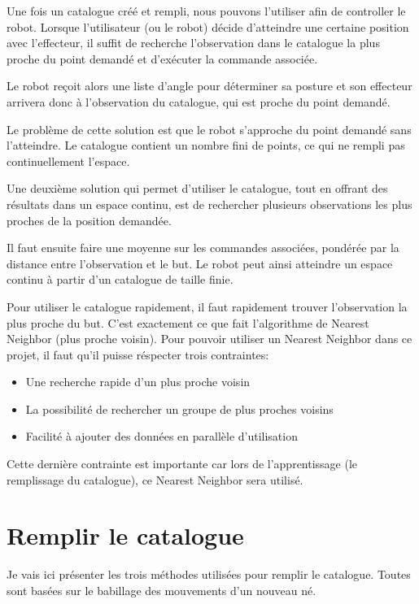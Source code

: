 \documentclass[11pt,french]{report}
\begin{document}
Une fois un catalogue créé et rempli, nous pouvons l'utiliser afin de controller le robot.
Lorsque l'utilisateur (ou le robot) décide d'atteindre une certaine position avec l'effecteur, il suffit de recherche l'observation dans le catalogue la plus proche du point demandé et d'exécuter la commande associée.

Le robot reçoit  alors une liste d'angle pour déterminer sa posture et son effecteur arrivera donc à l'observation du catalogue, qui est proche du point demandé.

\phantom{INVISIBLE LINE}

Le problème de cette solution est que le robot s'approche du point demandé sans l'atteindre.
Le catalogue contient un nombre fini de points, ce qui ne rempli pas continuellement l'espace.

Une deuxième solution qui permet d'utiliser le catalogue, tout en offrant des résultats dans un espace continu, est de rechercher plusieurs observations les plus proches de la position demandée.

Il faut ensuite faire une moyenne sur les commandes associées, pondérée par la distance entre l'observation et le but.
Le robot peut ainsi atteindre un espace continu à partir d'un catalogue de taille finie.

\phantom{INVISIBLE LINE}

Pour utiliser le catalogue rapidement, il faut rapidement trouver l'observation la plus proche du but.
C'est exactement ce que fait l'algorithme de Nearest Neighbor (plus proche voisin).
Pour pouvoir utiliser un Nearest Neighbor dans ce projet, il faut qu'il puisse réspecter trois contraintes:
\begin{itemize}
    \item Une recherche rapide d'un plus proche voisin
    \item La possibilité de rechercher un groupe de plus proches voisins
    \item Facilité à ajouter des données en parallèle d'utilisation
\end{itemize}
Cette dernière contrainte est importante car lors de l'apprentissage (le remplissage du catalogue), ce Nearest Neighbor sera utilisé.

\pagebreak
\section{Remplir le catalogue}

Je vais ici présenter les trois méthodes utilisées pour remplir le catalogue.
Toutes sont basées sur le babillage des mouvements d'un nouveau né.
\end{document}
